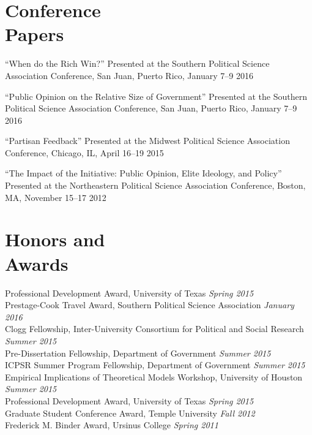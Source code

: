 \documentclass[margin,line]{res}
\newenvironment{list2}{
    \begin{list}{--}{%
        \setlength{\itemsep}{0in}
        \setlength{\parsep}{0in} \setlength{\parskip}{0in}
        \setlength{\topsep}{0in} \setlength{\partopsep}{0in}
        \setlength{\leftmargin}{0.2in}}}{\end{list}}
\begin{document}
\begin{resume}
\section{\sc Conference\\Papers}
\begin{list2}
\item ``When do the Rich Win?'' Presented at the Southern Political
  Science Association Conference, San Juan, Puerto Rico, January 7--9 2016
\item ``Public Opinion on the Relative Size of Government'' Presented
  at the Southern Political Science Association Conference, San Juan,
  Puerto Rico, January 7--9 2016
\item ``Partisan Feedback'' Presented at the Midwest Political Science
  Association Conference, Chicago, IL, April 16--19 2015
\item ``The Impact of the Initiative: Public Opinion, Elite Ideology,
  and Policy'' Presented at the Northeastern Political Science
  Association Conference, Boston, MA, November 15--17 2012
\end{list2}

\section{\sc Honors and \\Awards}
Professional Development Award, University of Texas \hfill
\emph{Spring 2015} \\
Prestage-Cook Travel Award, Southern Political Science Association
\hfill \emph{January 2016} \\
Clogg Fellowship, Inter-University Consortium for Political and Social
Research \hfill \emph{Summer 2015} \\
Pre-Dissertation Fellowship, Department of Government \hfill
\emph{Summer 2015} \\
ICPSR Summer Program Fellowship, Department of Government \hfill
\emph{Summer 2015} \\
Empirical Implications of Theoretical Models Workshop, University of
Houston  \hfill \emph{Summer 2015} \\
Professional Development Award, University of Texas \hfill
\emph{Spring 2015} \\
Graduate Student Conference Award, Temple University \hfill \emph{Fall
  2012} \\
Frederick M. Binder Award, Ursinus College \hfill \emph{Spring 2011} %


\end{resume}
\end{document}
